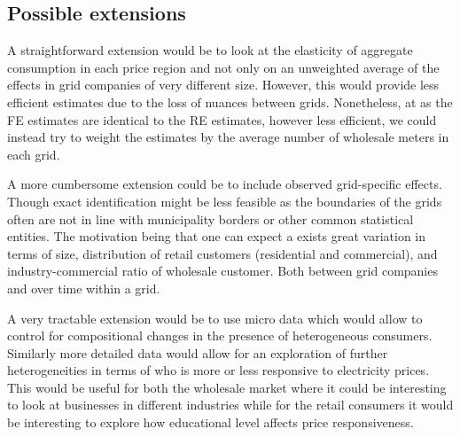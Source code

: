 \subsection{Possible extensions}
\label{subsec:r_extensions}
A straightforward extension would be to look at the elasticity of aggregate consumption in each price region and not only on an unweighted average of the effects in grid companies of very different size. However, this would provide less efficient estimates due to the loss of nuances between grids. Nonetheless, at as the FE estimates are identical to the RE estimates, however less efficient, we could instead try to weight the estimates by the average number of wholesale meters in each grid.
\bigskip\par
A more cumbersome extension could be to include observed grid-specific effects. Though exact identification might be less feasible as the boundaries of the grids often are not in line with municipality borders or other common statistical entities. The motivation being that one can expect a exists great variation in terms of size, distribution of retail customers (residential and commercial), and industry-commercial ratio of wholesale customer. Both between grid companies and over time within a grid.
\bigskip\par
A very tractable extension would be to use micro data which would allow to control for compositional changes in the presence of heterogeneous consumers. Similarly more detailed data would allow for an exploration of further heterogeneities in terms of who is more or less responsive to electricity prices. This would be useful for both the wholesale market where it could be interesting to look at businesses in different industries while for the retail consumers it would be interesting to explore how educational level affects price responsiveness.
